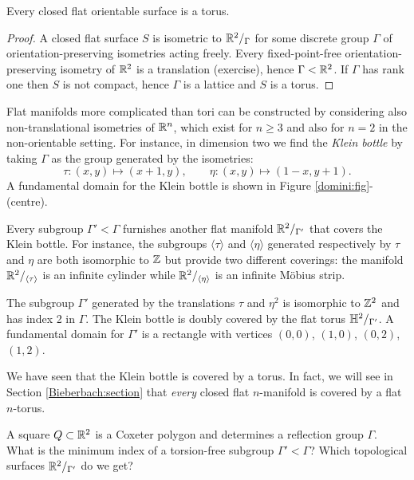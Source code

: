 \begin{prop} \label{flat:is:torus:prop}
Every closed flat orientable surface is a torus.
\end{prop}
\begin{proof}
A closed flat surface $S$ is isometric to $\mathbb{R}^2/_\Gamma$ for some discrete group $\Gamma$ of orientation-preserving isometries acting freely. Every fixed-point-free orientation-preserving isometry of $\mathbb{R}^2$ is a translation (exercise), hence $\Gamma < \mathbb{R}^2$. If $\Gamma$ has rank one then $S$ is not compact, hence $\Gamma$ is a lattice and $S$ is a torus.
\end{proof}

Flat manifolds more complicated than tori can be constructed by considering also non-translational isometries of $\mathbb{R}^n$, which exist for $n\geqslant 3$ and also for $n=2$ in the non-orientable setting. For instance, in dimension two we find the \emph{Klein bottle} by taking $\Gamma$ as the group generated by the isometries:
$$\tau\colon(x,y) \mapsto (x+1, y), \qquad \eta\colon(x,y) \mapsto (1-x, y+1).$$
A fundamental domain for the Klein bottle is shown in Figure \ref{domini:fig}-(centre).

Every subgroup $\Gamma' < \Gamma$ furnishes another flat manifold $\mathbb{R}^2/_{\Gamma'}$ that covers the Klein bottle. For instance, the subgroups $\langle \tau \rangle$ and $\langle \eta \rangle$ generated respectively by $\tau$ and $\eta$ are both isomorphic to $\mathbb{Z}$ but provide two different coverings: the manifold $\mathbb{R}^2/_{\langle\tau\rangle}$ is an infinite cylinder while $\mathbb{R}^2/_{\langle\eta\rangle}$ is an infinite M\"obius strip. 

The subgroup $\Gamma'$ generated by the translations $\tau$ and $\eta^2$ is isomorphic to $\mathbb{Z}^2$ and has index 2 in $\Gamma$. The Klein bottle is doubly covered by the flat torus $\mathbb{H}^2/_{\Gamma'}$. A fundamental domain for $\Gamma'$ is a rectangle with vertices $(0,0)$, $(1,0)$, $(0,2)$, $(1,2)$.

We have seen that the Klein bottle is covered by a torus. In fact, we will see in Section \ref{Bieberbach:section} that \emph{every} closed flat $n$-manifold is covered by a flat $n$-torus.

\begin{ex}
A square $Q\subset \mathbb{R}^2$ is a Coxeter polygon and determines a reflection group $\Gamma$. What is the minimum index of a torsion-free subgroup $\Gamma' < \Gamma$? Which topological surfaces $\mathbb{R}^2/_{\Gamma'}$ do we get?
\end{ex}

